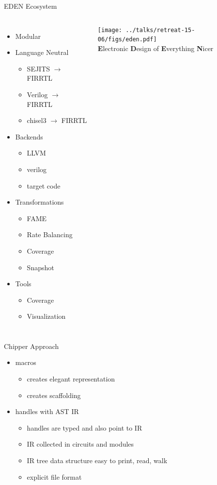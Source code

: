 \documentclass[xcolor=pdflatex,dvipsnames,table]{beamer}
\begin{document}
\begin{frame}[fragile]{EDEN Ecosystem}
\begin{columns}
\begin{itemize}
\item Modular
\item Language Neutral
\begin{itemize}
\item SEJITS $\rightarrow$ FIRRTL
\item Verilog $\rightarrow$ FIRRTL
\item chisel3 $\rightarrow$ FIRRTL
\end{itemize}    
\item Backends
\begin{itemize}
\item LLVM
\item verilog
\item target code  
\end{itemize}    
\item Transformations
\begin{itemize}
\item FAME
\item Rate Balancing  
\item Coverage
\item Snapshot
\end{itemize}    
\item Tools
\begin{itemize}
\item Coverage
\item Visualization
\end{itemize}    
\end{itemize}    
\begin{center}
\texttt{[image: ../talks/retreat-15-06/figs/eden.pdf]} \\[1cm]
{\footnotesize{\bf E}lectronic {\bf D}esign of {\bf E}verything {\bf N}icer}
\end{center}
\end{columns}
\end{frame}

\begin{frame}[fragile]{Chipper Approach}
\begin{itemize}
\item macros
\begin{itemize}
\item creates elegant representation
\item creates scaffolding
\end{itemize}
\item handles with AST IR
\begin{itemize}
\item handles are typed and also point to IR
\item IR collected in circuits and modules
\item IR tree data structure easy to print, read, walk
\item explicit file format
\end{itemize}
\end{itemize}

\end{frame}
\end{document}
